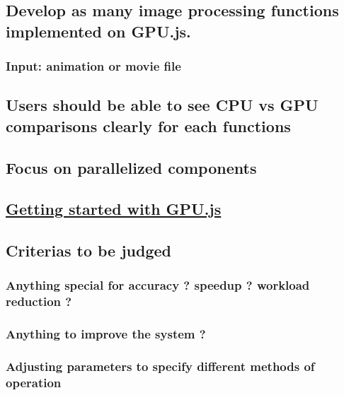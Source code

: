 \documentclass[11pt]{article}
\begin{document}
\subsection{Develop as many image processing functions implemented on GPU.js.}
\label{sec:orgb67a108}

\subsubsection{Input: animation or movie file}
\label{sec:org59eaedd}

\subsection{Users should be able to see CPU vs GPU comparisons clearly for each functions}
\label{sec:org04a0498}

\subsection{Focus on parallelized components}
\label{sec:orgaaf762b}

\subsection{\href{http://gpu.rocks/getting-started/}{Getting started with GPU.js}}
\label{sec:orge67a234}

\subsection{Criterias to be judged}
\label{sec:org5aa2dbb}

\subsubsection{Anything special for accuracy ? speedup ? workload reduction ?}
\label{sec:orgebe5afa}

\subsubsection{Anything to improve the system ?}
\label{sec:org117e5ec}

\subsubsection{Adjusting parameters to specify different methods of operation}
\label{sec:org1ea5ada}
\end{document}
